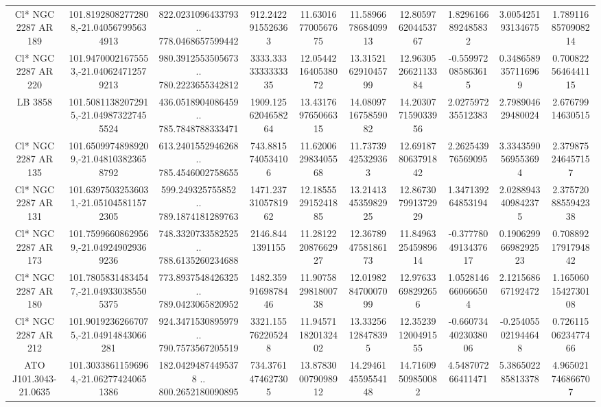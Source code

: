 \begin{table}
\begin{tabular}{cccccccccc}
Cl* NGC 2287     AR     189 & 101.81928082772808,-21.040567995634913 & 822.0231096433793 .. 778.0468657599442 & 912.2422915526363 & 11.630167700567675 & 11.589667868409913 & 12.805976204453767 & 1.8296166892485832 & 3.005425193134675 & 1.7891168570908214 \\
Cl* NGC 2287     AR     220 & 101.94700021675553,-21.040624712579213 & 980.3912553505673 .. 780.2223655342812 & 3333.3333333333335 & 12.054421640538072 & 13.315216291045799 & 12.963052662113384 & -0.559972085863615 & 0.3486589357116969 & 0.7008225646441115 \\
LB  3858 & 101.50811382072915,-21.049873227455524 & 436.0518904086459 .. 785.7848788333471 & 1909.1256204658264 & 13.431769765066315 & 14.080971675859082 & 14.203077159033956 & 2.027597235512383 & 2.798904629480024 & 2.67679914630515 \\
Cl* NGC 2287     AR     135 & 101.65099748989209,-21.048103823658792 & 613.2401552946268 .. 785.4546002758655 & 743.8815740534106 & 11.620062983405568 & 11.73739425329363 & 12.691878063791842 & 2.262543976569095 & 3.3343590569553694 & 2.379875246457157 \\
Cl* NGC 2287     AR     131 & 101.63975032536031,-21.051045811572305 & 599.249325755852 .. 789.1874181289763 & 1471.2373105781962 & 12.185552915241885 & 13.214134535982925 & 12.867307991372929 & 1.347139264853194 & 2.0288943409842375 & 2.3757208855942338 \\
Cl* NGC 2287     AR     173 & 101.75996608629569,-21.049249029369236 & 748.3320733582525 .. 788.6135260234688 & 2146.8441391155 & 11.281222087662927 & 12.367894758186173 & 11.849632545989614 & -0.3777804913437617 & 0.19062996698292523 & 0.7088921791794842 \\
Cl* NGC 2287     AR     180 & 101.78058314834547,-21.049330385505375 & 773.8937548426325 .. 789.0423065820952 & 1482.3599169878446 & 11.907582981800738 & 12.019828470007099 & 12.97633698292656 & 1.0528146660666504 & 2.121568667192472 & 1.1650601542730108 \\
Cl* NGC 2287     AR     212 & 101.90192362667075,-21.04914843066281 & 924.3471530895979 .. 790.7573567205519 & 3321.155762205248 & 11.945711820132402 & 13.33256128478395 & 12.352391200491555 & -0.6607344023038006 & -0.254055021944648 & 0.7261150623477466 \\
ATO J101.3043-21.0635 & 101.30338611596964,-21.062774240651386 & 182.04294874495378 .. 800.2652180090895 & 734.3761474627305 & 13.878300079098912 & 14.294614559554148 & 14.71609509850082 & 4.548707266411471 & 5.386502285813378 & 4.965021746866707 \\

\end{tabular}
\end{table}
